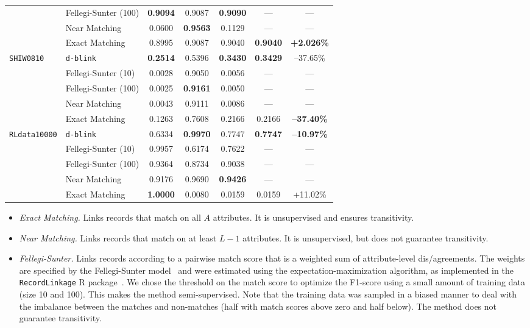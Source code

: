 \documentclass[12pt,letterpaper]{article}
\newcommand{\1}[1]{\mathbb{I}\!\left[#1\right]} %
\newcommand{\dblink}{\texttt{\upshape \lowercase{d-blink}}} %
\begin{document}
\begin{table}[t]
\begin{center}
\begin{tabular}{l l *{5}{c}}
		& Fellegi-Sunter (100)  & \textbf{0.9094} & 0.9087 & \textbf{0.9090} & --- & --- \\
		& Near Matching         & 0.0600 & \textbf{0.9563} & 0.1129 & --- & --- \\
		& Exact Matching        & 0.8995 & 0.9087 & 0.9040 & \textbf{0.9040} & \textbf{+2.026\%} \\ 
		\midrule
		\multirow{5}{*}{\texttt{SHIW0810}}
		& \dblink\              & \textbf{0.2514} & 0.5396 & \textbf{0.3430} & \textbf{0.3429} & --37.65\% \\
		& Fellegi-Sunter (10)   & 0.0028 & 0.9050 & 0.0056 & --- & --- \\
		& Fellegi-Sunter (100)  & 0.0025 & \textbf{0.9161} & 0.0050 & --- & --- \\
		& Near Matching         & 0.0043 & 0.9111 & 0.0086 & --- & --- \\
		& Exact Matching        & 0.1263 & 0.7608 & 0.2166 & 0.2166 & \textbf{--37.40\%} \\ 
		\midrule
		\multirow{5}{*}{\texttt{RLdata10000}}
		& \dblink\              & 0.6334 & \textbf{0.9970} & 0.7747 & \textbf{0.7747} & 
		\textbf{--10.97\%} \\
		& Fellegi-Sunter (10)   & 0.9957 & 0.6174 & 0.7622 & --- & --- \\
		& Fellegi-Sunter (100)  & 0.9364 & 0.8734 & 0.9038 & --- & --- \\
		& Near Matching         & 0.9176 & 0.9690 & \textbf{0.9426} & --- & --- \\
		& Exact Matching        & \textbf{1.0000} & 0.0080 & 0.0159 & 0.0159 & +11.02\% \\ 
		\bottomrule
  \end{tabular}
  \end{center}
\end{table}

\begin{itemize}
  \item \emph{Exact Matching.} Links records that match on all $A$ attributes.
  It is unsupervised and ensures transitivity.
  \item \emph{Near Matching.} Links records that match on at least $L - 1$ 
  attributes.
  It is unsupervised, but does not guarantee transitivity.
  \item \emph{Fellegi-Sunter.} Links records according to a pairwise match 
  score that is a weighted sum of attribute-level dis\slash agreements.
  The weights are specified by the Fellegi-Sunter 
  model~\citep{fellegi_theory_1969} and were estimated using the   
  expectation-maximization algorithm, as implemented in the 
  \texttt{RecordLinkage} R package~\citep{sariyar_recordlinkage_2010}.
  We chose the threshold on the match score to optimize 
  the F1-score using a small amount of training data (size 10 and 100). 
  This makes the method semi-supervised.
  Note that the training data was sampled in a biased manner 
  to deal with the imbalance between the matches and non-matches
  (half with match scores above zero and half below).
  The method does not guarantee transitivity.
\end{itemize}
\end{document}
